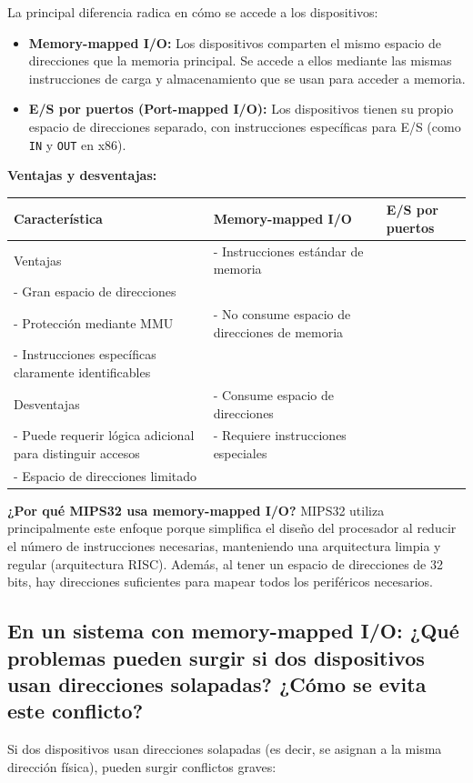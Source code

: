 \documentclass[12pt]{article}
\begin{document}
	La principal diferencia radica en cómo se accede a los dispositivos:
	
	\begin{itemize}
		\item \textbf{Memory-mapped I/O:} Los dispositivos comparten el mismo espacio de direcciones que la memoria principal. Se accede a ellos mediante las mismas instrucciones de carga y almacenamiento que se usan para acceder a memoria.
		\item \textbf{E/S por puertos (Port-mapped I/O):} Los dispositivos tienen su propio espacio de direcciones separado, con instrucciones específicas para E/S (como \texttt{IN} y \texttt{OUT} en x86).
	\end{itemize}
	
	\textbf{Ventajas y desventajas:}
	
	\begin{table}[h]
		\centering
		\begin{tabular}{|p{4cm}|p{5cm}|p{5cm}|}
			\hline
			\textbf{Característica} & \textbf{Memory-mapped I/O} & \textbf{E/S por puertos} \\
			\hline
			Ventajas & - Instrucciones estándar de memoria \\- Gran espacio de direcciones \\- Protección mediante MMU & - No consume espacio de direcciones de memoria \\- Instrucciones específicas claramente identificables \\
			\hline
			Desventajas & - Consume espacio de direcciones \\- Puede requerir lógica adicional para distinguir accesos & - Requiere instrucciones especiales \\- Espacio de direcciones limitado \\
			\hline
		\end{tabular}
	\end{table}
	
	\textbf{¿Por qué MIPS32 usa memory-mapped I/O?} MIPS32 utiliza principalmente este enfoque porque simplifica el diseño del procesador al reducir el número de instrucciones necesarias, manteniendo una arquitectura limpia y regular (arquitectura RISC). Además, al tener un espacio de direcciones de 32 bits, hay direcciones suficientes para mapear todos los periféricos necesarios.
	
	\subsection{En un sistema con memory-mapped I/O: ¿Qué problemas pueden surgir si dos dispositivos usan direcciones solapadas? ¿Cómo se evita este conflicto?}
	Si dos dispositivos usan direcciones solapadas (es decir, se asignan a la misma dirección física), pueden surgir conflictos graves:
	
\end{document}
